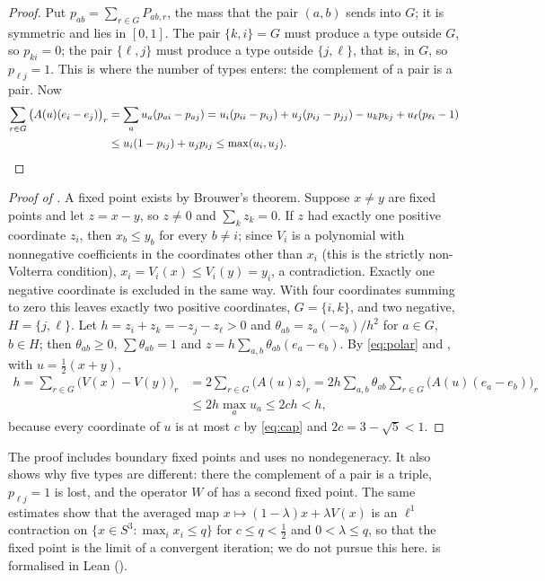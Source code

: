 \documentclass[11pt]{amsart}
\theoremstyle{definition}
\begin{document}
\begin{proof}
Put $p_{ab}=\sum_{r\in G}P_{ab,r}$, the mass that the pair $(a,b)$ sends into $G$; it is symmetric and lies in $[0,1]$. The pair $\{k,i\}=G$ must produce a type outside $G$, so $p_{ki}=0$; the pair $\{\ell,j\}$ must produce a type outside $\{j,\ell\}$, that is, in $G$, so $p_{\ell j}=1$. This is where the number of types enters: the complement of a pair is a pair. Now
\begin{align*}
\sum_{r\in G}\big(A(u)(e_i-e_j)\big)_r&=\sum_au_a(p_{ai}-p_{aj})
=u_i(p_{ii}-p_{ij})+u_j(p_{ij}-p_{jj})-u_kp_{kj}+u_\ell(p_{\ell i}-1)\\
&\le u_i(1-p_{ij})+u_jp_{ij}\le\max(u_i,u_j).\qedhere
\end{align*}
\end{proof}

\begin{proof}[Proof of ]
A fixed point exists by Brouwer's theorem. Suppose $x\ne y$ are fixed points and let $z=x-y$, so $z\ne0$ and $\sum_kz_k=0$. If $z$ had exactly one positive coordinate $z_i$, then $x_b\le y_b$ for every $b\ne i$; since $V_i$ is a polynomial with nonnegative coefficients in the coordinates other than $x_i$ (this is the strictly non-Volterra condition), $x_i=V_i(x)\le V_i(y)=y_i$, a contradiction. Exactly one negative coordinate is excluded in the same way. With four coordinates summing to zero this leaves exactly two positive coordinates, $G=\{i,k\}$, and two negative, $H=\{j,\ell\}$. Let $h=z_i+z_k=-z_j-z_\ell>0$ and $\theta_{ab}=z_a(-z_b)/h^2$ for $a\in G$, $b\in H$; then $\theta_{ab}\ge0$, $\sum\theta_{ab}=1$ and $z=h\sum_{a,b}\theta_{ab}(e_a-e_b)$. By \eqref{eq:polar} and , with $u=\frac12(x+y)$,
\begin{align*}
h=\sum_{r\in G}\big(V(x)-V(y)\big)_r&=2\sum_{r\in G}\big(A(u)z\big)_r
=2h\sum_{a,b}\theta_{ab}\sum_{r\in G}\big(A(u)(e_a-e_b)\big)_r\\
&\le2h\max_au_a\le2ch<h,
\end{align*}
because every coordinate of $u$ is at most $c$ by \eqref{eq:cap} and $2c=3-\sqrt5<1$.
\end{proof}

The proof includes boundary fixed points and uses no nondegeneracy. It also shows why five types are different: there the complement of a pair is a triple, $p_{\ell j}=1$ is lost, and the operator $W$ of  has a second fixed point. The same estimates show that the averaged map $x\mapsto(1-\lambda)x+\lambda V(x)$ is an $\ell^1$ contraction on $\{x\in S^3:\max_ix_i\le q\}$ for $c\le q<\frac12$ and $0<\lambda\le q$, so that the fixed point is the limit of a convergent iteration; we do not pursue this here.  is formalised in Lean ().
\end{document}

